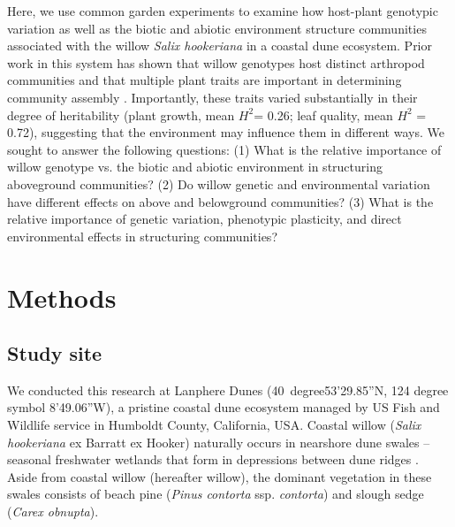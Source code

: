 \documentclass[11pt]{article}
\begin{document}
Here, we use common garden experiments to examine how host-plant
genotypic variation as well as the biotic and abiotic environment
structure communities associated with the willow \emph{Salix hookeriana}
in a coastal dune ecosystem. Prior work in this system has shown that
willow genotypes host distinct arthropod communities and that multiple
plant traits are important in determining community assembly
\cite{Barbour_2015}\cite{Barbour_2016}. Importantly, these traits varied
substantially in their degree of heritability (plant growth, mean
\(H^2\)= 0.26; leaf quality, mean \(H^2\) = 0.72),
suggesting that the environment may influence them in different ways. We
sought to answer the following questions: (1) What is the relative
importance of willow genotype vs. the biotic and abiotic environment in
structuring aboveground communities? (2) Do willow genetic and
environmental variation have different effects on above and belowground
communities? (3) What is the relative importance of genetic
variation, phenotypic plasticity, and direct environmental effects in
structuring communities?


\section*{Methods}

\subsection*{Study site}

We conducted this research at Lanphere Dunes (40\
degree53'29.85''N,
124 degree symbol 8'49.06''W), a pristine coastal dune ecosystem managed by
US Fish and Wildlife service in Humboldt County, California, USA.
Coastal willow (\emph{Salix hookeriana} ex Barratt ex Hooker) naturally
occurs in nearshore dune swales -- seasonal freshwater wetlands that
form in depressions between dune ridges \cite{pickart2007beach}. Aside from
coastal willow (hereafter willow), the dominant vegetation in these
swales consists of beach pine (\emph{Pinus contorta} ssp.
\emph{contorta}) and slough sedge (\emph{Carex obnupta}).
\end{document}

